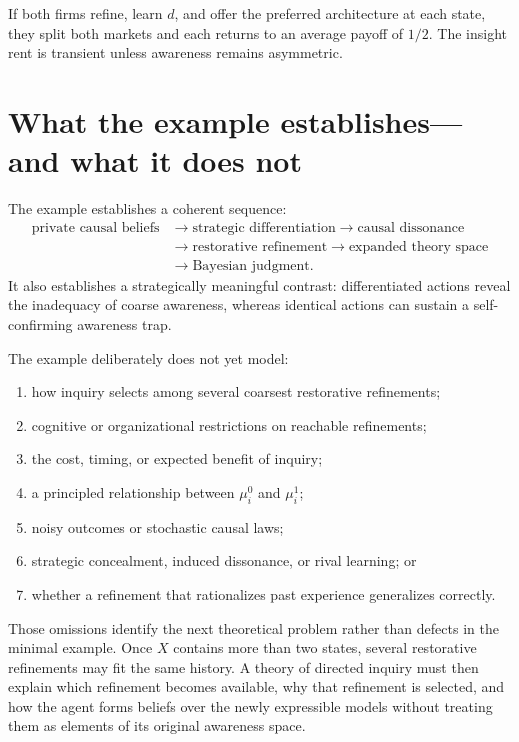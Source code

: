 \documentclass[11pt]{article}
\begin{document}
If both firms refine, learn $d$, and offer the preferred architecture at each state, they split both markets and each returns to an average payoff of $1/2$.  The insight rent is transient unless awareness remains asymmetric.

\section{What the example establishes---and what it does not}

The example establishes a coherent sequence:
\begin{align*}
\text{private causal beliefs}
&\longrightarrow
\text{strategic differentiation}
\longrightarrow
\text{causal dissonance}\\
&\longrightarrow
\text{restorative refinement}
\longrightarrow
\text{expanded theory space}\\
&\longrightarrow
\text{Bayesian judgment}.
\end{align*}
It also establishes a strategically meaningful contrast: differentiated actions reveal the inadequacy of coarse awareness, whereas identical actions can sustain a self-confirming awareness trap.

The example deliberately does not yet model:
\begin{enumerate}[label=(\roman*)]
  \item how inquiry selects among several coarsest restorative refinements;
  \item cognitive or organizational restrictions on reachable refinements;
  \item the cost, timing, or expected benefit of inquiry;
  \item a principled relationship between $\mu_i^0$ and $\mu_i^1$;
  \item noisy outcomes or stochastic causal laws;
  \item strategic concealment, induced dissonance, or rival learning; or
  \item whether a refinement that rationalizes past experience generalizes correctly.
\end{enumerate}

Those omissions identify the next theoretical problem rather than defects in the minimal example.  Once $X$ contains more than two states, several restorative refinements may fit the same history.  A theory of directed inquiry must then explain which refinement becomes available, why that refinement is selected, and how the agent forms beliefs over the newly expressible models without treating them as elements of its original awareness space.
\end{document}
